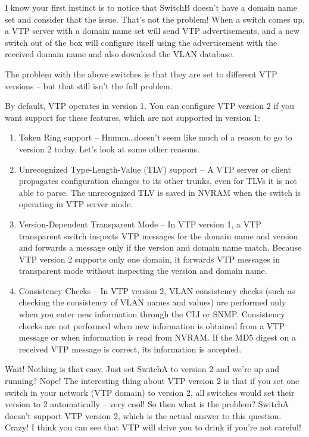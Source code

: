 \documentclass[b5paper,11pt]{memoir}
\begin{document}
I know your first instinct is to notice that SwitchB doesn't have a
domain name set and consider that the issue. That's not the problem!
When a switch comes up, a VTP server with a domain name set will send
VTP advertisements, and a new switch out of the box will configure
itself using the advertisement with the received domain name and also
download the VLAN database.

The problem with the above switches is that they are set to different
VTP versions -- but that still isn't the full problem.

By default, VTP
operates in version 1. You can configure VTP version 2 if you want
support for these features, which are not supported in version 1:

\begin{enumerate}
\tightlist
\item
  Token Ring support -- Hmmm\ldots doesn't seem like much of a reason to
  go to version 2 today. Let's look at some other reasons.
\item
  Unrecognized Type-Length-Value (TLV) support -- A VTP server or client
  propagates configuration changes to its other trunks, even for TLVs it
  is not able to parse. The unrecognized TLV is saved in NVRAM when the
  switch is operating in VTP server mode.
\item
  Version-Dependent Transparent Mode -- In VTP version 1, a VTP
  transparent switch inspects VTP messages for the domain name and
  version and forwards a message only if the version and domain name
  match. Because VTP version 2 supports only one domain, it forwards VTP
  messages in transparent mode without inspecting the version and domain
  name.
\item
  Consistency Checks -- In VTP version 2, VLAN consistency checks (such
  as checking the consistency of VLAN names and values) are performed
  only when you enter new information through the CLI or SNMP.
  Consistency checks are not performed when new information is obtained
  from a VTP message or when information is read from NVRAM. If the MD5
  digest on a received VTP message is correct, its information is
  accepted.
\end{enumerate}

Wait! Nothing is that easy. Just set SwitchA to version 2 and we're up
and running? Nope! The interesting thing about VTP version 2 is that if
you set one switch in your network (VTP domain) to version 2, all
switches would set their version to 2 automatically -- very cool! So then
what is the problem? SwitchA doesn't support VTP version 2, which is the
actual answer to this question. Crazy! I think you can see that VTP will
drive you to drink if you're not careful!
\end{document}
